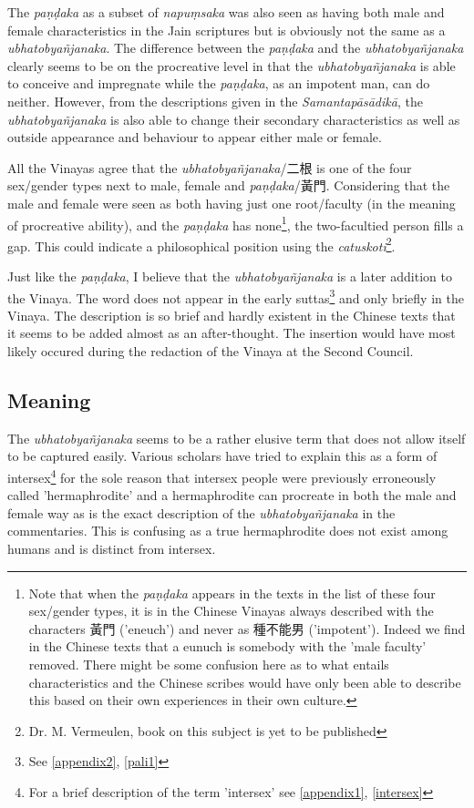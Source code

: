 The {\em paṇḍaka} as a subset of {\em napuṃsaka} was also seen as having both male and female characteristics in the Jain scriptures but is obviously not the same as a {\em ubhatob­yañ­janaka}. The difference between the {\em paṇḍaka} and the {\em ubhatob­yañ­janaka} clearly seems to be on the procreative level in that the {\em ubhatob­yañ­janaka} is able to conceive and impregnate while the {\em paṇḍaka}, as an impotent man, can do neither. However, from the descriptions given in the {\em Samantapāsādikā}, the {\em ubhatob­yañ­janaka} is also able to change their secondary characteristics as well as outside appearance and behaviour to appear either male or female.

All the Vinayas agree that the {\em ubhatob­yañ­janaka}/二根 is one of the four sex/gender types next to male, female and {\em paṇḍaka}/黃門. Considering that the male and female were seen as both having just one root/faculty (in the meaning of procreative ability), and the {\em paṇḍaka} has none\footnote{Note that when the {\em paṇḍaka} appears in the texts in the list of these four sex/gender types, it is in the Chinese Vinayas always described with the characters 黃門 ('eneuch') and never as 種不能男 ('impotent'). Indeed we find in the Chinese texts that a eunuch is somebody with the 'male faculty' removed. There might be some confusion here as to what entails characteristics and the Chinese scribes would have only been able to describe this based on their own experiences in their own culture.}, the two-facultied person fills a gap. This could indicate a philosophical position using the {\em catuskoti}\footnote{Dr. M. Vermeulen, book on this subject is yet to be published}. 

Just like the {\em paṇḍaka}, I believe that the {\em ubhatob­yañ­janaka} is a later addition to the Vinaya. The word does not appear in the early suttas\footnote{See \ref{appendix2}, \ref{pali1}} and only briefly in the Vinaya. The description is so brief and hardly existent in the Chinese texts that it seems to be added almost as an after-thought. The insertion would have most likely occured during the redaction of the Vinaya at the Second Council.

\subsection{Meaning}
The {\em ubhatob­yañ­janaka} seems to be a rather elusive term that does not allow itself to be captured easily. Various scholars have tried to explain this as a form of intersex\footnote{For a brief description of the term 'intersex' see \ref{appendix1}, \ref{intersex}} for the sole reason that intersex people were previously erroneously called 'hermaphrodite' and a hermaphrodite can procreate in both the male and female way as is the exact description of the {\em ubhatob­yañ­janaka} in the commentaries. This is confusing as a true hermaphrodite does not exist among humans and is distinct from intersex. 

